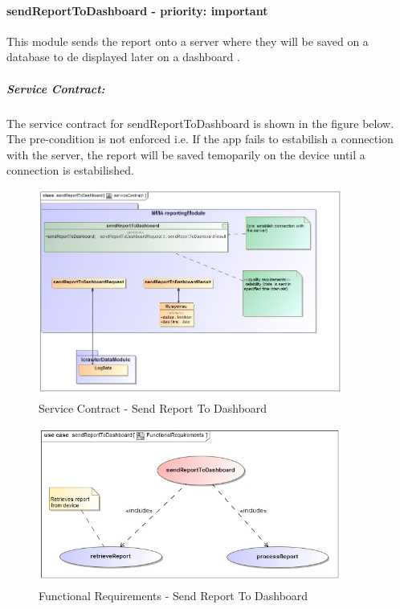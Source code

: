 \documentclass[hidelinks, 12pt, oneside]{article}
\begin{document}
								
		\paragraph{ sendReportToDashboard - priority: important}
		This module sends the report onto a server where they will be saved on a database to de displayed later on a dashboard .\newline
		\subparagraph{Service Contract:}
			The service contract for sendReportToDashboard is shown in the figure below. The pre-condition is not enforced i.e. If the app fails to estabilish a connection with the server, the report will be saved temoparily on the device until a connection is estabilished.
			
		
		\begin{figure}[!htbp]
    		\centering
    		\includegraphics[width=0.9\textwidth]{img/serviceContractSendReportToDashboard.jpg}
    		\caption{Service Contract - Send Report To Dashboard}
    		\label{fig:ServiceCon_submitReport}
		\end{figure}
		\newpage	
			
		\begin{figure}[!htbp]
    		\centering
    		\includegraphics[width=0.9\textwidth]{img/functionalRequirementsSendReportToDashboard.jpg}
    		\caption{Functional Requirements - Send Report To Dashboard}
    		\label{fig:FunctionalReq_submitReport}
		\end{figure}
		
\end{document}
